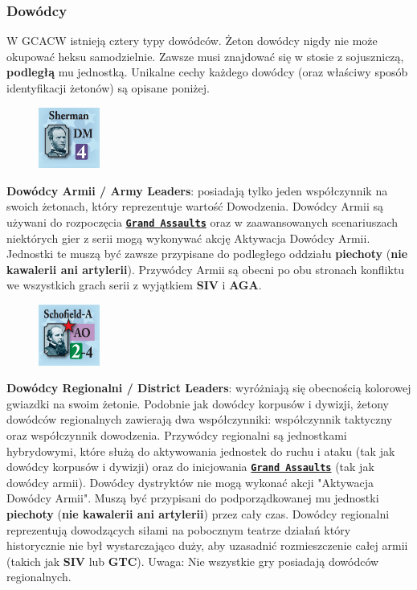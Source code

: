 \documentclass[10pt,twoside,a4paper,table]{article}
\begin{document}
\begin{multicols*}{2}
	\subsubsection*{Dowódcy}
	W GCACW istnieją cztery typy dowódców. Żeton dowódcy nigdy nie może okupować heksu samodzielnie. Zawsze musi znajdować się w stosie z sojuszniczą, \textbf{podległą} mu jednostką. Unikalne cechy każdego dowódcy (oraz właściwy sposób identyfikacji żetonów) są opisane poniżej.\par
	\begin{figure}
		\includegraphics[width=2cm, height=2cm]{leader_1.png} 
	\end{figure}
	\textbf{Dowódcy Armii / Army Leaders}: posiadają tylko jeden współczynnik na swoich żetonach, który reprezentuje wartość Dowodzenia. Dowódcy Armii są używani do rozpoczęcia \textbf{\texttt{\underline {Grand Assaults}}} oraz w zaawansowanych scenariuszach niektórych gier z serii mogą wykonywać akcję Aktywacja Dowódcy Armii. Jednostki te muszą być zawsze przypisane do podległego oddziału \textbf{piechoty} (\textbf{nie kawalerii ani artylerii}). Przywódcy Armii są obecni po obu stronach konfliktu we wszystkich grach serii z wyjątkiem \textbf{SIV} i \textbf{AGA}.\par
	\begin{figure}
		\includegraphics[width=2cm, height=2cm]{leader_2.png} 
	\end{figure}
	\textbf{Dowódcy Regionalni / District Leaders}: wyróżniają się obecnością kolorowej gwiazdki na swoim żetonie. Podobnie jak dowódcy korpusów i dywizji, żetony dowódców regionalnych zawierają dwa współczynniki: współczynnik taktyczny oraz współczynnik dowodzenia. Przywódcy regionalni są jednostkami hybrydowymi, które służą do aktywowania jednostek do ruchu i ataku (tak jak dowódcy korpusów i dywizji) oraz do inicjowania \textbf{\texttt{\underline {Grand Assaults}}} (tak jak dowódcy armii). Dowódcy dystryktów nie mogą wykonać akcji "Aktywacja Dowódcy Armii". Muszą być przypisani do podporządkowanej mu jednostki \textbf{piechoty} (\textbf{nie kawalerii ani artylerii}) przez cały czas. Dowódcy regionalni reprezentują dowodzących siłami na pobocznym teatrze działań który historycznie nie był wystarczająco duży, aby uzasadnić rozmieszczenie całej armii (takich jak \textbf{SIV} lub \textbf{GTC}). Uwaga: Nie wszystkie gry posiadają dowódców regionalnych.\par

\end{multicols*}
\end{document}
